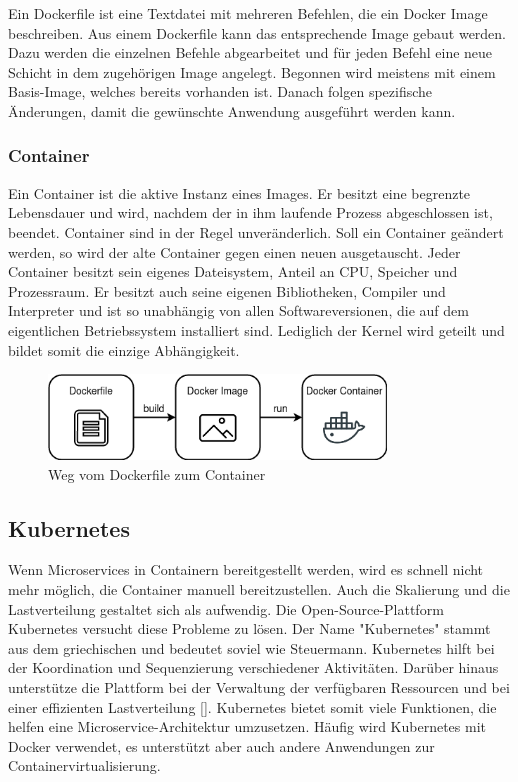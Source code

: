 Ein Dockerfile ist eine Textdatei mit mehreren Befehlen, die ein Docker Image beschreiben. Aus einem Dockerfile kann das entsprechende Image gebaut werden. Dazu werden die einzelnen Befehle abgearbeitet und für jeden Befehl eine neue Schicht in dem zugehörigen Image angelegt. Begonnen wird meistens mit einem Basis-Image, welches bereits vorhanden ist. Danach folgen spezifische Änderungen, damit die gewünschte Anwendung ausgeführt werden kann.

\subsubsection{Container}
Ein Container ist die aktive Instanz eines Images. Er besitzt eine begrenzte Lebensdauer und wird, nachdem der in ihm laufende Prozess abgeschlossen ist, beendet. Container sind in der Regel unveränderlich. Soll ein Container geändert werden, so wird der alte Container gegen einen neuen ausgetauscht. Jeder Container besitzt sein eigenes Dateisystem, Anteil an CPU, Speicher und Prozessraum. Er besitzt auch seine eigenen Bibliotheken, Compiler und Interpreter und ist so unabhängig von allen Softwareversionen, die auf dem eigentlichen Betriebssystem installiert sind. Lediglich der Kernel wird geteilt und bildet somit die einzige Abhängigkeit. 

\begin{figure}[H] 
    \centering
    \includegraphics[width=0.8\textwidth]{figures/DockerFileImageContainer.png}
    \caption{Weg vom Dockerfile zum Container}
\end{figure}

\subsection{Kubernetes}

Wenn Microservices in Containern bereitgestellt werden, wird es schnell nicht mehr möglich, die Container manuell bereitzustellen. Auch die Skalierung und die Lastverteilung gestaltet sich als aufwendig. Die Open-Source-Plattform Kubernetes versucht diese Probleme zu lösen. Der Name "Kubernetes" stammt aus dem griechischen und bedeutet soviel wie Steuermann. Kubernetes hilft bei der Koordination und Sequenzierung verschiedener Aktivitäten. Darüber hinaus unterstütze die Plattform bei der Verwaltung der verfügbaren Ressourcen und bei einer effizienten Lastverteilung [\cite[S. 11]{arundelCloud2019}]. Kubernetes bietet somit viele Funktionen, die helfen eine Microservice-Architektur umzusetzen. Häufig wird Kubernetes mit Docker verwendet, es unterstützt aber auch andere Anwendungen zur Containervirtualisierung.


